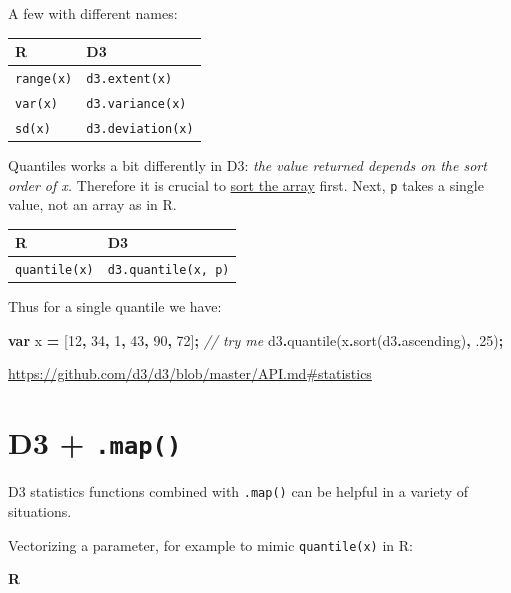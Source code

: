 \documentclass[
  openany]{book}
\newenvironment{Shaded}{\begin{snugshade}}{\end{snugshade}}
\newcommand{\AttributeTok}[1]{\textcolor[rgb]{0.77,0.63,0.00}{#1}}
\newcommand{\CommentTok}[1]{\textcolor[rgb]{0.56,0.35,0.01}{\textit{#1}}}
\newcommand{\DecValTok}[1]{\textcolor[rgb]{0.00,0.00,0.81}{#1}}
\newcommand{\FloatTok}[1]{\textcolor[rgb]{0.00,0.00,0.81}{#1}}
\newcommand{\FunctionTok}[1]{\textcolor[rgb]{0.00,0.00,0.00}{#1}}
\newcommand{\KeywordTok}[1]{\textcolor[rgb]{0.13,0.29,0.53}{\textbf{#1}}}
\newcommand{\NormalTok}[1]{#1}
\newcommand{\OperatorTok}[1]{\textcolor[rgb]{0.81,0.36,0.00}{\textbf{#1}}}
\begin{document}
A few with different names:

\begin{longtable}[]{@{}ll@{}}
\toprule
R & D3\tabularnewline
\midrule
\endhead
\texttt{range(x)} & \texttt{d3.extent(x)}\tabularnewline
\texttt{var(x)} & \texttt{d3.variance(x)}\tabularnewline
\texttt{sd(x)} & \texttt{d3.deviation(x)}\tabularnewline
\bottomrule
\end{longtable}

Quantiles works a bit differently in D3: \emph{the value returned depends on the sort order of x.} Therefore it is crucial to \href{just-enough-js.html\#sorting}{sort the array} first. Next, \texttt{p} takes a single value, not an array as in R.

\begin{longtable}[]{@{}ll@{}}
\toprule
R & D3\tabularnewline
\midrule
\endhead
\texttt{quantile(x)} & \texttt{d3.quantile(x,\ p)}\tabularnewline
\bottomrule
\end{longtable}

Thus for a single quantile we have:

\begin{Shaded}
\begin{Highlighting}[]
\KeywordTok{var}\NormalTok{ x }\OperatorTok{=}\NormalTok{ [}\DecValTok{12}\OperatorTok{,} \DecValTok{34}\OperatorTok{,} \DecValTok{1}\OperatorTok{,} \DecValTok{43}\OperatorTok{,} \DecValTok{90}\OperatorTok{,} \DecValTok{72}\NormalTok{]}\OperatorTok{;}      \CommentTok{// try me}
\NormalTok{d3}\OperatorTok{.}\FunctionTok{quantile}\NormalTok{(x}\OperatorTok{.}\FunctionTok{sort}\NormalTok{(d3}\OperatorTok{.}\AttributeTok{ascending}\NormalTok{)}\OperatorTok{,} \FloatTok{.25}\NormalTok{)}\OperatorTok{;}
\end{Highlighting}
\end{Shaded}

\url{https://github.com/d3/d3/blob/master/API.md\#statistics}

\hypertarget{d3-.map}{%
\section{\texorpdfstring{D3 + \texttt{.map()}}{D3 + .map()}}\label{d3-.map}}

D3 statistics functions combined with \texttt{.map()} can be helpful in a variety of situations.

Vectorizing a parameter, for example to mimic \texttt{quantile(x)} in R:

\textbf{R}
\end{document}
